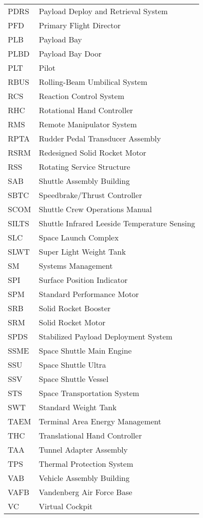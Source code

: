 \documentclass[Space_Shuttle_Vessel_Manual.tex]{subfiles}
\begin{document}
\begin{longtable}{l l }
PDRS & Payload Deploy and Retrieval System\\
PFD & Primary Flight Director\\
PLB & Payload Bay\\
PLBD & Payload Bay Door\\
PLT & Pilot\\
RBUS & Rolling-Beam Umbilical System\\
RCS & Reaction Control System\\
RHC & Rotational Hand Controller\\
RMS & Remote Manipulator System\\
RPTA & Rudder Pedal Transducer Assembly\\
RSRM & Redesigned Solid Rocket Motor\\
RSS & Rotating Service Structure\\
SAB & Shuttle Assembly Building\\
SBTC & Speedbrake/Thrust Controller\\
SCOM & Shuttle Crew Operations Manual\\
SILTS & Shuttle Infrared Leeside Temperature Sensing\\
SLC & Space Launch Complex\\
SLWT & Super Light Weight Tank\\
SM & Systems Management\\
SPI & Surface Position Indicator\\
SPM & Standard Performance Motor\\
SRB & Solid Rocket Booster\\
SRM & Solid Rocket Motor\\
SPDS & Stabilized Payload Deployment System\\
SSME & Space Shuttle Main Engine\\
SSU & Space Shuttle Ultra\\
SSV & Space Shuttle Vessel\\
STS & Space Transportation System\\
SWT & Standard Weight Tank\\
TAEM & Terminal Area Energy Management\\
THC & Translational Hand Controller\\
TAA & Tunnel Adapter Assembly\\
TPS & Thermal Protection System\\
VAB & Vehicle Assembly Building\\
VAFB & Vandenberg Air Force Base\\
VC & Virtual Cockpit\\
\end{longtable}
\end{document}
